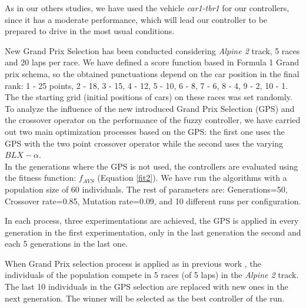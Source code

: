 \documentclass[10pt,journal,compsoc]{IEEEtran}
\begin{document}
As in our others studies, we have used the vehicle \textit{car1-tbr1} for our controllers, since it has a moderate performance, which will lead our controller to be prepared to drive in the most usual conditions.

New Grand Prix Selection has been conducted considering \textit{Alpine 2} track, 5 races and 20 laps per race. 
We have defined a score function based in Formula 1 Grand prix schema, so the obtained punctuations depend on the car position in the final rank: 1 - 25 points, 2 - 18, 3 - 15, 4 - 12, 5 - 10, 6 - 8, 7 - 6, 8 - 4, 9 - 2, 10 - 1. The the starting grid (initial positions of cars) on these races was set randomly.\\

To analyze the influence of the new introduced Grand Prix Selection (GPS) and the crossover operator on the performance of the fuzzy controller, we have carried out  two main optimization processes based on the GPS: the first one uses the GPS with the two point crossover operator while the second uses the varying $BLX-\alpha$. \\
In the generations where the GPS is not used, the controllers are evaluated using the fitness function: $f_{AVS}$ (Equation \ref{fit2}).
We have run the algorithms with a population size of 60 individuals. The rest of parameters are: Generations=50, Crossover rate=0.85, Mutation rate=0.09, and 10 different runs per configuration.

In each process, three experimentations are achieved, the GPS is applied in every generation in the first experimentation, only in the last generation the second and each 5 generations in the last one.
 
When Grand Prix selection process is applied as in previous work \cite{salem_cig2018}, the individuals of the population compete in 5 races (of 5 laps) in the \textit{Alpine 2} track. The last 10 individuals  in the GPS selection are replaced with new ones in the next generation. The winner will be selected as the best controller of the run.
\end{document}
